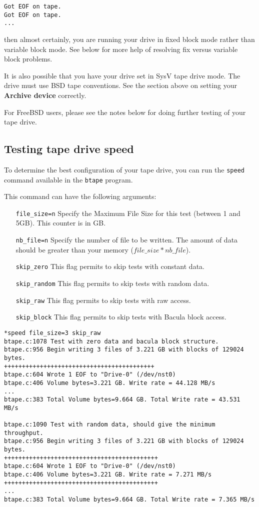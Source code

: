 \footnotesize
\begin{verbatim}
Got EOF on tape.
Got EOF on tape.
...
\end{verbatim}
\normalsize

then almost certainly, you are running your drive in fixed block mode rather
than variable block mode. See below for more help of resolving fix
versus variable block problems.

It is also possible that you have your drive
set in SysV tape drive mode. The drive must use BSD tape conventions.
See the section above on setting your {\bf Archive device} correctly.

For FreeBSD users, please see the notes below for doing further testing of
your tape drive.

\subsection{Testing tape drive speed}
\label{sec:btapespeed}

To determine the best configuration of your tape drive, you can run the
\texttt{speed} command available in the \texttt{btape} program.

This command can have the following arguments:
\begin{itemize}
\item[\texttt{file\_size=n}] Specify the Maximum File Size for this test
  (between 1 and 5GB). This counter is in GB.
\item[\texttt{nb\_file=n}] Specify the number of file to be written. The amount
  of data should be greater than your memory ($file\_size*nb\_file$).
\item[\texttt{skip\_zero}] This flag permits to skip tests with constant
  data.
\item[\texttt{skip\_random}] This flag permits to skip tests with random
  data.
\item[\texttt{skip\_raw}] This flag permits to skip tests with raw access.
\item[\texttt{skip\_block}] This flag permits to skip tests with Bacula block
  access.
\end{itemize}

\begin{verbatim}
*speed file_size=3 skip_raw
btape.c:1078 Test with zero data and bacula block structure.
btape.c:956 Begin writing 3 files of 3.221 GB with blocks of 129024 bytes.
++++++++++++++++++++++++++++++++++++++++++
btape.c:604 Wrote 1 EOF to "Drive-0" (/dev/nst0)
btape.c:406 Volume bytes=3.221 GB. Write rate = 44.128 MB/s
...
btape.c:383 Total Volume bytes=9.664 GB. Total Write rate = 43.531 MB/s

btape.c:1090 Test with random data, should give the minimum throughput.
btape.c:956 Begin writing 3 files of 3.221 GB with blocks of 129024 bytes.
+++++++++++++++++++++++++++++++++++++++++++
btape.c:604 Wrote 1 EOF to "Drive-0" (/dev/nst0)
btape.c:406 Volume bytes=3.221 GB. Write rate = 7.271 MB/s
+++++++++++++++++++++++++++++++++++++++++++
...
btape.c:383 Total Volume bytes=9.664 GB. Total Write rate = 7.365 MB/s

\end{verbatim}


